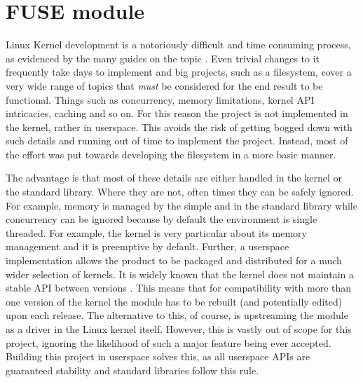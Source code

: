     \section{FUSE module}
        \label{sec:FUSE}

        Linux Kernel development is a notoriously difficult and time consuming
        process, as evidenced by the many guides on the topic
        \cite{kernelnewbies_developer, Linux_howto}. Even trivial changes
        to it frequently take days to implement and big projects, such as a
        filesystem, cover a very wide range of topics that \textit{must} be
        considered for the end result to be functional. Things such as
        concurrency, memory limitations, kernel API intricacies, caching and so
        on. For this reason the project is not implemented in the kernel,
        rather in userspace. This avoids the risk of getting bogged down with
        such details and running out of time to implement the project. Instead,
        most of the effort was put towards developing the filesystem in a more
        basic manner.

        The advantage is that most of these details are either handled in the
        kernel or the standard library. Where they are not, often times they
        can be safely ignored. For example, memory is managed by the simple
         and  in the standard library while
        concurrency can be ignored because by default the environment is single
        threaded. For example, the kernel is very particular about its memory
        management and it is preemptive by default. Further, a userspace
        implementation allows the product to be packaged and distributed for a
        much wider selection of kernels. It is widely known that the kernel
        does not maintain a stable API between versions
        \cite{Linux_stable_api}. This means that for compatibility with more
        than one version of the kernel the module has to be rebuilt (and
        potentially edited) upon each release. The alternative to this, of
        course, is upstreaming the module as a driver in the Linux kernel
        itself. However, this is vastly out of scope for this project, ignoring
        the likelihood of such a major feature being ever accepted. Building
        this project in userspace solves this, as all userspace APIs are
        guaranteed stability \cite{never_break_userspace} and standard
        libraries follow this rule.

